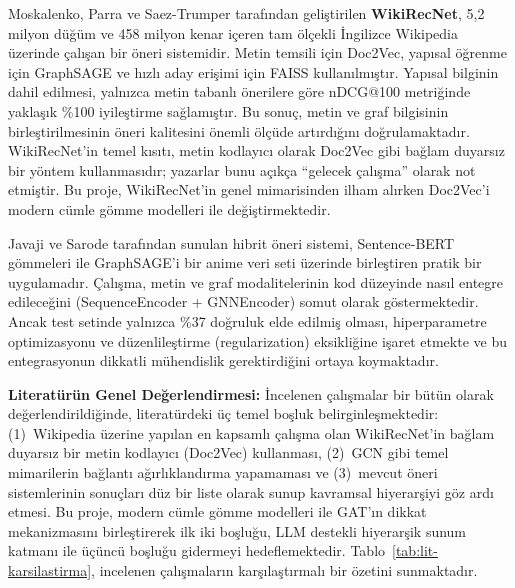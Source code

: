 Moskalenko, Parra ve Saez-Trumper \cite{wikirecnet2020} tarafından geliştirilen \textbf{WikiRecNet}, 5,2 milyon düğüm ve 458 milyon kenar içeren tam ölçekli İngilizce Wikipedia üzerinde çalışan bir öneri sistemidir. Metin temsili için Doc2Vec, yapısal öğrenme için GraphSAGE ve hızlı aday erişimi için FAISS kullanılmıştır. Yapısal bilginin dahil edilmesi, yalnızca metin tabanlı önerilere göre nDCG@100 metriğinde yaklaşık \%100 iyileştirme sağlamıştır. Bu sonuç, metin ve graf bilgisinin birleştirilmesinin öneri kalitesini önemli ölçüde artırdığını doğrulamaktadır. WikiRecNet'in temel kısıtı, metin kodlayıcı olarak Doc2Vec gibi bağlam duyarsız bir yöntem kullanmasıdır; yazarlar bunu açıkça ``gelecek çalışma'' olarak not etmiştir. Bu proje, WikiRecNet'in genel mimarisinden ilham alırken Doc2Vec'i modern cümle gömme modelleri ile değiştirmektedir.

Javaji ve Sarode \cite{anime_hybrid_gnn_bert} tarafından sunulan hibrit öneri sistemi, Sentence-BERT gömmeleri ile GraphSAGE'i bir anime veri seti üzerinde birleştiren pratik bir uygulamadır. Çalışma, metin ve graf modalitelerinin kod düzeyinde nasıl entegre edileceğini (SequenceEncoder + GNNEncoder) somut olarak göstermektedir. Ancak test setinde yalnızca \%37 doğruluk elde edilmiş olması, hiperparametre optimizasyonu ve düzenlileştirme (regularization) eksikliğine işaret etmekte ve bu entegrasyonun dikkatli mühendislik gerektirdiğini ortaya koymaktadır.

\vspace{0.5em}
\noindent\textbf{Literatürün Genel Değerlendirmesi:}
İncelenen çalışmalar bir bütün olarak değerlendirildiğinde, literatürdeki üç temel boşluk belirginleşmektedir: (1)~Wikipedia üzerine yapılan en kapsamlı çalışma olan WikiRecNet'in bağlam duyarsız bir metin kodlayıcı (Doc2Vec) kullanması, (2)~GCN gibi temel mimarilerin bağlantı ağırlıklandırma yapamaması ve (3)~mevcut öneri sistemlerinin sonuçları düz bir liste olarak sunup kavramsal hiyerarşiyi göz ardı etmesi. Bu proje, modern cümle gömme modelleri ile GAT'ın dikkat mekanizmasını birleştirerek ilk iki boşluğu, LLM destekli hiyerarşik sunum katmanı ile üçüncü boşluğu gidermeyi hedeflemektedir. Tablo~\ref{tab:lit-karsilastirma}, incelenen çalışmaların karşılaştırmalı bir özetini sunmaktadır.

